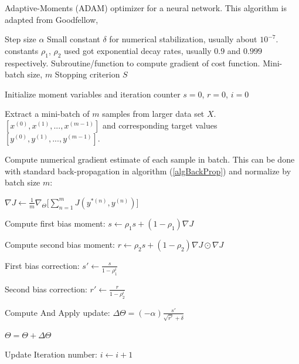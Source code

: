 \documentclass[12pt,letterpaper]{article}
\begin{document}
\begin{algorithm}[H]
\caption{Adaptive-Moments (ADAM) optimizer for a neural network. This algorithm is adapted from Goodfellow, \cite{Goodfellow}}
\label{algAdaGrad}

\begin{algorithmic}
\REQUIRE Step size $\alpha$
\REQUIRE Small constant $\delta$ for numerical stabilization, usually about $10^{-7}$.
\REQUIRE constants $\rho_1$, $\rho_2$ used got exponential decay rates, usually $0.9$ and $0.999$ respectively.
\REQUIRE Subroutine/function to compute gradient of cost function.
\REQUIRE Mini-batch size, $m$
\REQUIRE Stopping criterion $S$

Initialize moment variables and iteration counter $s = 0$, $r = 0$, $i = 0$ \\

	\item Extract a mini-batch of $m$ samples from larger data set $X$. $[x^{(0)},x^{(1)},...,x^{(m-1)}]$ and corresponding target values 
	$[y^{(0)},y^{(1)},...,y^{(m-1)}]$.
	\item Compute numerical gradient estimate of each sample in batch. This can be done with standard back-propagation in algorithm (\ref{algBackProp}) and 			 	normalize by batch size $m$:
	\item $\nabla J \leftarrow \frac{1}{m} \nabla_{\Theta} \Big[\sum_{n=1}^{m} J(y^{*(n)},y^{(n)}) \Big]$
	
	\item Compute first bias moment: $s \leftarrow \rho_1 s + (1 - \rho_1) \nabla J$
	\item Compute second bias moment: $r \leftarrow \rho_2 s + (1 - \rho_2) \nabla J \odot \nabla J$
	\item First bias correction: $s' \leftarrow \frac{s}{1 - \rho_1^i}$
	\item Second bias correction: $r' \leftarrow \frac{r}{1 - \rho_2^i}$
	
	\item Compute And Apply update:	$\Delta \Theta = (-\alpha) \frac{s'}{\sqrt{r'} + \delta}$
	\item $\Theta = \Theta + \Delta \Theta$	
	\item Update Iteration number: $i \leftarrow i + 1$
\ENDWHILE

\end{algorithmic}
\end{algorithm}


\end{document}
